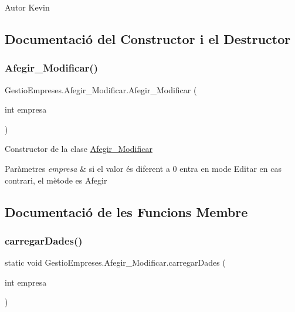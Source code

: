 \begin{DoxyAuthor}{Autor}
Kevin 
\end{DoxyAuthor}


\subsection{Documentació del Constructor i el Destructor}
\mbox{\label{class_gestio_empreses_1_1_afegir___modificar_a5a9fe23eba7323eb0068cf645ab9db2e}} 
\subsubsection{\texorpdfstring{Afegir\_Modificar()}{Afegir\_Modificar()}}
{\footnotesize\ttfamily Gestio\+Empreses.\+Afegir\+\_\+\+Modificar.\+Afegir\+\_\+\+Modificar (\begin{DoxyParamCaption}\item[{int}]{empresa }\end{DoxyParamCaption})}

Constructor de la clase \mbox{\hyperlink{class_gestio_empreses_1_1_afegir___modificar}{Afegir\+\_\+\+Modificar}} 
\begin{DoxyParams}{Paràmetres}
{\em empresa} & si el valor és diferent a 0 entra en mode \textquotesingle{}Editar\textquotesingle{} en cas contrari, el mètode es \textquotesingle{}Afegir\textquotesingle{} \\
\hline
\end{DoxyParams}


\subsection{Documentació de les Funcions Membre}
\mbox{\label{class_gestio_empreses_1_1_afegir___modificar_a43a503c514d5e5c8a18f0c542ddf5e51}} 
\subsubsection{\texorpdfstring{carregarDades()}{carregarDades()}}
{\footnotesize\ttfamily static void Gestio\+Empreses.\+Afegir\+\_\+\+Modificar.\+carregar\+Dades (\begin{DoxyParamCaption}\item[{int}]{empresa }\end{DoxyParamCaption})\hspace{0.3cm}{\ttfamily [static]}}

